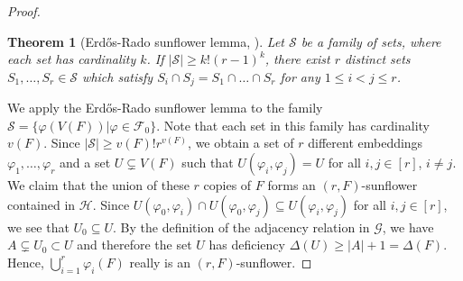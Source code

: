 \documentclass[11pt]{article}
\numberwithin{equation}{section}
\def\cF{\mathcal{F}}
\def\cG{\mathcal{G}}
\def\cH{\mathcal{H}}
\def\cS{\mathcal{S}}
\theoremstyle{plain}
\newtheorem*{theorem*}{Theorem}
\theoremstyle{remark}
\begin{document}
\begin{proof}
\begin{theorem*} [Erd\H{o}s-Rado sunflower lemma, \cite{ER60}]

Let $\cS$ be a family of sets, where each set has cardinality $k$. If $|\cS|\geq k!(r-1)^k$, there exist $r$ distinct sets $S_1, \dots, S_r\in \cS$ which satisfy $S_i\cap S_j=S_1\cap \dots\cap S_r$ for any $1\leq i< j\leq r$.
\end{theorem*}

\noindent
We apply the Erd\H{o}s-Rado sunflower lemma to the family $\cS=\{\varphi(V(F))|\varphi\in \cF_0\}$. Note that each set in this family has cardinality $v(F)$. Since $|\cS|\geq v(F)!r^{v(F)}$, we obtain a set of $r$ different embeddings $\varphi_1, \dots, \varphi_r$ and a set $U\subsetneq V(F)$ such that $U(\varphi_i, \varphi_{j})=U$ for all $i, j\in [r]$, $i\neq j$. We claim that the union of these $r$ copies of $F$ forms an $(r, F)$-sunflower contained in $\cH$. Since $U(\varphi_0, \varphi_i)\cap U(\varphi_0, \varphi_{j})\subseteq U(\varphi_i, \varphi_{j})$ for all $i, j\in [r]$, we see that $U_0\subseteq U$. By the definition of the adjacency relation in $\cG$, we have $A\subsetneq U_0\subset U$ and therefore the set $U$ has deficiency $\Delta(U)\geq |A|+1=\Delta(F)$. Hence,  $\bigcup_{i=1}^r \varphi_i(F)$ really is an $(r, F)$-sunflower.


\end{proof}
\end{document}
